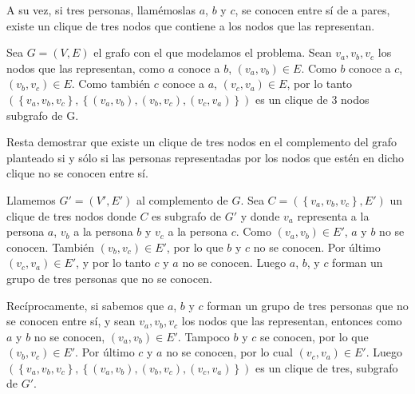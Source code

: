 \documentclass[a4paper, 12pt]{article}
\begin{document}
A su vez, si tres personas, llamémoslas $a$, $b$ y $c$, se conocen entre sí de a pares, existe un clique de tres nodos que contiene a los nodos que las representan. 


Sea $ G = \left( V, E \right) $ el grafo con el que modelamos el problema. Sean $v_a, v_b, v_c$ los nodos que las representan, como $a$ conoce a $b$, $\left( v_a,v_b \right) \in E $. Como $b$ conoce a $c$, $ \left(v_b, v_c \right) \in E$. Como también $c$ conoce a $a$, $ \left( v_c, v_a \right) \in E$, por lo tanto $\left( \left\lbrace v_a, v_b, v_c \right\rbrace, \left\lbrace  \left(v_a,v_b\right) , \left( v_b,v_c\right), \left( v_c, v_a\right) \right\rbrace\right)$ es un clique de 3 nodos subgrafo de G.


Resta demostrar que existe un clique de tres nodos en el complemento del grafo planteado si y sólo si las personas representadas por los nodos que estén en dicho clique no se conocen entre sí.


Llamemos $G' = \left( V', E' \right)$ al complemento de $G$.  Sea $ C = \left( \left\lbrace v_a, v_b,v_c \right\rbrace, E' \right) $ un clique de tres nodos donde $C$ es subgrafo de $G'$ y donde $v_a$ representa a la persona $a$, $v_b$ a la persona $b$ y $v_c$ a la persona $c$. Como $\left( v_a,v_b\right) \in E'$, $a$ y $b$ no se conocen. También $\left( v_b,v_c\right) \in E'$, por lo que $b$ y $c$ no se conocen. Por último $\left( v_c,v_a\right) \in E'$, y por lo tanto $c$ y $a$ no se conocen. Luego $a$, $b$, y $c$ forman un grupo de tres personas que no se conocen.



Recíprocamente, si sabemos que $a$, $b$ y $c$ forman un grupo de tres personas que no se conocen entre sí, y sean $v_a, v_b, v_c$ los nodos que las representan, entonces como $a$ y $b$ no se conocen, $\left(v_a,v_b\right) \in E'$. Tampoco $b$ y $c$ se conocen, por lo que $\left(v_b,v_c\right) \in E'$. Por último $c$ y $a$ no se conocen, por lo cual $\left(v_c,v_a\right) \in E'$. Luego $\left( \left\lbrace v_a, v_b, v_c \right\rbrace, \left\lbrace  \left(v_a,v_b\right) , \left( v_b,v_c\right), \left( v_c, v_a\right) \right\rbrace\right)$ es un clique de tres, subgrafo de $G'$.
\end{document}
